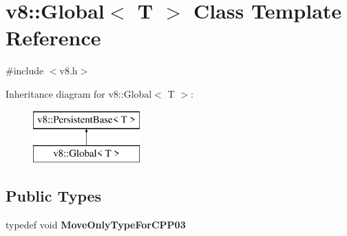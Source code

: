 \hypertarget{classv8_1_1_global}{}\section{v8\+:\+:Global$<$ T $>$ Class Template Reference}
\label{classv8_1_1_global}


{\ttfamily \#include $<$v8.\+h$>$}

Inheritance diagram for v8\+:\+:Global$<$ T $>$\+:\begin{figure}[H]
\begin{center}
\leavevmode
\includegraphics[height=2.000000cm]{classv8_1_1_global}
\end{center}
\end{figure}
\subsection*{Public Types}
\begin{DoxyCompactItemize}
\item 
typedef void {\bfseries Move\+Only\+Type\+For\+C\+P\+P03}\hypertarget{classv8_1_1_global_a295826e79781fe585904e652884db72f}{}\label{classv8_1_1_global_a295826e79781fe585904e652884db72f}

\end{DoxyCompactItemize}
